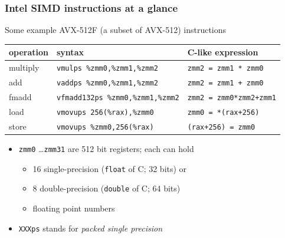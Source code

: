 \documentclass[12pt,dvipdfmx]{beamer}
\newcommand{\ao}[1]{{\color{blue}#1}}
\begin{document}
\begin{frame}
\frametitle{Intel SIMD instructions at a glance}
Some example \ao{AVX-512F} (a subset of AVX-512) instructions
\begin{center}
{\footnotesize
\begin{tabular}{|l|l|l|}\hline
operation & syntax                         & C-like expression \\\hline
multiply & {\tt \ao{vmulps} \%zmm0,\%zmm1,\%zmm2} & {\tt zmm2 = zmm1 * zmm0} \\
add      & {\tt \ao{vaddps} \%zmm0,\%zmm1,\%zmm2} & {\tt zmm2 = zmm1 + zmm0} \\
fmadd    & {\tt \ao{vfmadd132ps} \%zmm0,\%zmm1,\%zmm2} & {\tt zmm2 = zmm0*zmm2+zmm1} \\
load     & {\tt \ao{vmovups} 256(\%rax),\%zmm0}   & {\tt zmm0 = *(rax+256)} \\
store    & {\tt \ao{vmovups} \%zmm0,256(\%rax)}   & {\tt *(rax+256) = zmm0} \\
\hline
\end{tabular}}
\end{center}

\begin{itemize}
\item {\tt zmm0} \ldots {\tt zmm31} are 512 bit registers; each can hold
  \begin{itemize}
  \item 16 single-precision ({\tt float} of C; 32 bits) or
  \item 8 double-precision ({\tt double} of C; 64 bits) 
  \item [] floating point numbers
  \end{itemize}
\item {\tt XXXps} stands for {\em \ao{p}acked \ao{s}ingle precision}
\end{itemize}
\end{frame}
\end{document}
